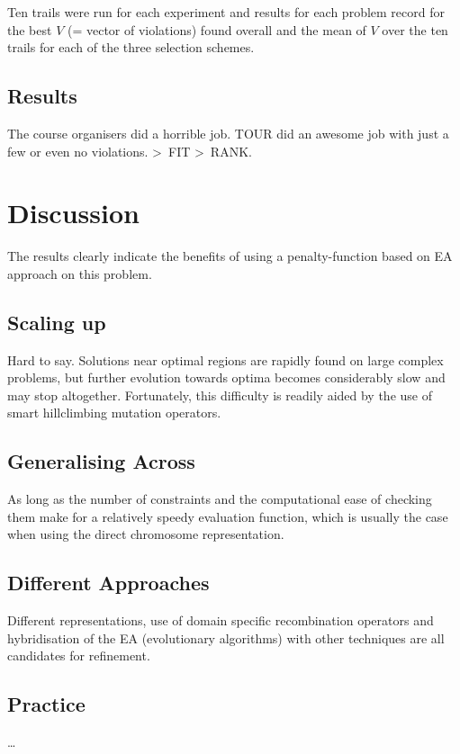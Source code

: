 \documentclass[12pt]{book}
\begin{document}
Ten trails were run for each experiment and results for each problem record for the best $V$ (= vector of violations) found overall and the mean of $V$ over the ten trails for each of the three selection schemes.

\subsection{Results}
The course organisers did a horrible job. TOUR did an awesome job with just a few or even no violations. \textgreater\ FIT \textgreater\ RANK.

\section{Discussion}
The results clearly indicate the benefits of using a penalty-function based on EA approach on this problem.

\subsection{Scaling up}
Hard to say. Solutions near optimal regions are rapidly found on large complex problems, but further evolution towards optima becomes considerably slow and may stop altogether. Fortunately, this difficulty is readily aided by the use of smart hillclimbing mutation operators.

\subsection{Generalising Across}
As long as the number of constraints and the computational ease of checking them make for a relatively speedy evaluation function, which is usually the case when using the direct chromosome representation.

\subsection{Different Approaches}
Different representations, use of domain specific recombination operators and hybridisation of the EA (evolutionary algorithms) with other techniques are all candidates for refinement.

\subsection{Practice}
\dots
\end{document}
